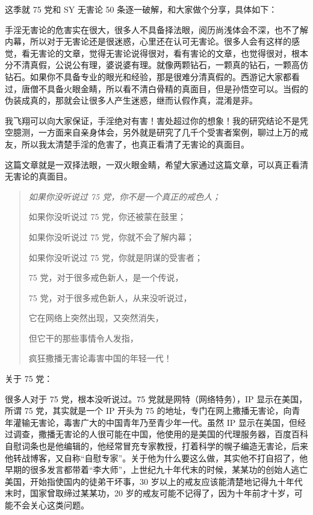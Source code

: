 \documentclass{ctexart}
\begin{document}
这季就 75 党和 SY 无害论 50 条逐一破解，和大家做个分享，具体如下：

手淫无害论的危害实在很大，很多人不具备择法眼，阅历尚浅体会不深，也不了解内幕，所以对于无害论还是很迷惑，心里还在认可无害论。很多人会有这样的感觉，看无害论的文章，觉得无害论说得很对，看有害论的文章，也觉得很对，根本分不清真假，公说公有理，婆说婆有理。就像两颗钻石，一颗真的钻石，一颗高仿钻石。如果你不具备专业的眼光和经验，那是很难分清真假的。西游记大家都看过，唐僧不具备火眼金睛，所以看不清白骨精的真面目，但是孙悟空可以。当假的伪装成真的，那就会让很多人产生迷惑，继而认假作真，混淆是非。

我飞翔可以向大家保证，手淫绝对有害！害处超过你的想象！我的研究结论不是凭空臆测，一方面来自亲身体会，另外就是研究了几千个受害者案例，聊过上万的戒友，所以我太清楚手淫的危害了，也真正看清了无害论的真面目。

这篇文章就是一双择法眼，一双火眼金睛，希望大家通过这篇文章，可以真正看清无害论的真面目。

\begin{quotation}\it
    如果你没听说过 75 党，你不是一个真正的戒色人；

    如果你没听说过 75 党，你还被蒙在鼓里；

    如果你没听说过 75 党，你就不会了解内幕；

    如果你没听说过 75 党，你就是阴谋的受害者；

    75 党，对于很多戒色新人，是一个传说，

    75 党，对于很多戒色新人，从来没听说过，

    它在网络上突然出现，又突然消失，

    但它干的那些事情令人发指，

    疯狂撒播无害论毒害中国的年轻一代！
\end{quotation}

关于 75 党：

很多人对于 75 党，根本没听说过。75 党就是网特（网络特务），IP 显示在美国，所谓 75 党，其实就是一个 IP 开头为 75 的地址，专门在网上撒播无害论，向青年灌输无害论，毒害广大的中国青年乃至青少年一代。虽然 IP 显示在美国，但经过调查，撒播无害论的人很可能在中国，他使用的是美国的代理服务器，百度百科自慰词条也是他编辑的，他经常冒充专家教授，打着科学的幌子编造无害论，后来他转战博客，又自称“自慰专家”。关于他为什么要这么做，其实他不打自招了，他早期的很多发言都带着“李大师”，上世纪九十年代末的时候，某某功的创始人逃亡美国，开始指使国内的徒弟干坏事，30 岁以上的戒友应该能清楚地记得九十年代末时，国家曾取缔过某某功，20 岁的戒友可能不记得了，因为十年前才十岁，可能不会关心这类问题。
\end{document}
